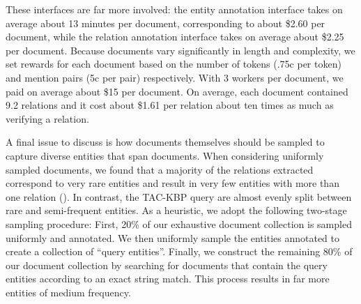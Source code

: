 These interfaces are far more involved: the entity annotation interface takes on average about 13 minutes per document, corresponding to about \$2.60 per document, while the relation annotation interface takes on average about \$2.25 per document.
Because documents vary significantly in length and complexity, we set rewards for each document based on the number of tokens (.75c per token) and mention pairs (5c per pair) respectively.
With 3 workers per document, we paid on average about \$15 per document.
On average, each document contained 9.2 relations and it cost about \$1.61 per relation about ten times as much as verifying a relation.

A final issue to discuss is how documents themselves should be sampled to capture diverse entities that span documents.
When considering uniformly sampled documents, we found that a majority of the relations extracted correspond to very rare entities and result in very few entities with more than one relation ().
In contrast, the TAC-KBP query are almost evenly split between rare and semi-frequent entities.
As a heuristic, we adopt the following two-stage sampling procedure:
First, 20\% of our exhaustive document collection is sampled uniformly and annotated.
We then uniformly sample the entities annotated to create a collection of ``query entities''.
Finally, we construct the remaining 80\% of our document collection by searching for documents that contain the query entities according to an exact string match. This process results in far more entities of medium frequency.

